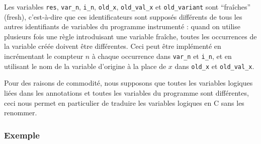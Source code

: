 Les variables \lstinline'res', \lstinline'var_n', \lstinline'i_n',
\lstinline|old_x|, \lstinline'old_val_x' et \lstinline|old_variant| sont
``fraîches'' (fresh), c'est-à-dire que ces identificateurs sont supposés
différents de tous les autres identifiants de variables du programme instrumenté
: quand on utilise plusieurs fois une règle introduisant une variable fraîche,
toutes les occurrences de la variable créée doivent être différentes.
Ceci peut être implémenté en incrémentant le compteur $n$ à chaque occurrence
dans \lstinline'var_n' et \lstinline'i_n', et en utilisant le nom de la variable
d'origine à la place de $x$ dans \lstinline'old_x' et \lstinline'old_val_x'.

Pour des raisons de commodité, nous supposons que toutes les variables logiques
liées dans les annotations et toutes les variables du programme sont
différentes, ceci nous permet en particulier de traduire les variables logiques
en C sans les renommer.


\subsubsection*{Exemple}
\label{sec:translation-example}




